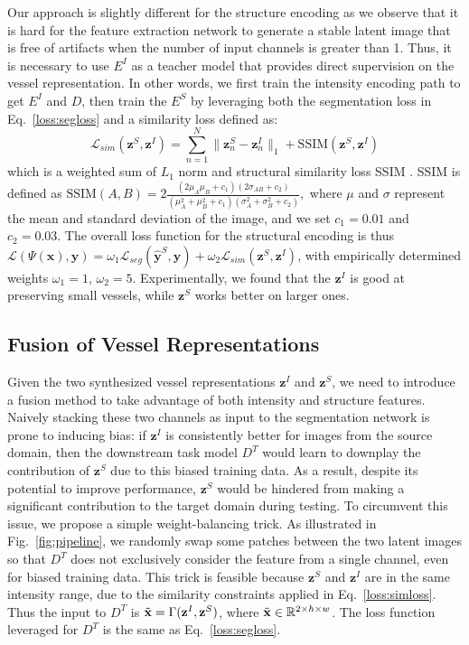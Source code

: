 \documentclass[runningheads]{llncs}
\begin{document}
Our approach is slightly different for the structure encoding as we observe that it is hard for the feature extraction network to generate a stable latent image that is free of artifacts when the number of input channels is greater than 1. Thus, it is necessary to use $E^I$ as a teacher model that provides direct supervision on the vessel representation. In other words, we first train the intensity encoding path to get $E^{I}$ and $D$, then train the $E^{S}$ by leveraging both the segmentation loss in Eq.~\ref{loss:segloss} and a similarity loss defined as: 
\begin{equation}
    \mathcal{L}_{sim}(\mathbf{z}^S,\mathbf{z}^I) =   \sum_{n=1}^N\|\mathbf{z}^S_{n}-\mathbf{z}^I_{n}\|_1 + \mathrm{SSIM}(\mathbf{z}^S, \mathbf{z}^I)
\label{loss:simloss}
\end{equation}
which is a weighted sum of $L_1$ norm and structural similarity loss SSIM \cite{hore2010image}. 
SSIM is defined as 
$
    \mathrm{SSIM}(A, B) = 2\frac{(2\mu_{A}\mu_{B}+c_1)(2\sigma_{AB}+c_2)}{(\mu_{A}^2+\mu_{B}^2+c_1)(\sigma_{A}^2+\sigma_{B}^2+c_2)},
$
where $\mu$ and $\sigma$ represent the mean and standard deviation of the image, and we set $c_1=0.01$ and $c_2=0.03$. The overall loss function for the structural encoding is thus
$\mathcal{L}(\Psi(\mathbf{x}),\mathbf{y}) = \omega_1 \mathcal{L}_{seg}(\hat{\mathbf{y}}^S,\mathbf{y})+\omega_2 \mathcal{L}_{sim}(\mathbf{z}^S,\mathbf{z}^I)$,
with empirically determined weights $\omega_1=1$, $\omega_2=5$. Experimentally, we found that the $\mathbf{z}^I$ is good at preserving small vessels, while $\mathbf{z}^S$ works better on larger ones.


\subsection{Fusion of Vessel Representations} \label{Sec:fusion}
Given the two synthesized vessel representations $\mathbf{z}^I$ and $\mathbf{z}^S$, we need to introduce a fusion method to take advantage of both intensity and structure features. Naively stacking these two channels as input to the segmentation network is prone to inducing bias: if $\mathbf{z}^I$ is consistently better for images from the source domain, then the downstream task model $D^{T}$ would learn to downplay the contribution of $\mathbf{z}^S$ due to this biased training data. As a result, despite its potential to improve performance, $\mathbf{z}^S$ would be hindered from making a significant contribution to the target domain during testing. To circumvent this issue, we propose a simple weight-balancing trick. As illustrated in Fig.~\ref{fig:pipeline}, we randomly swap some patches between the two latent images so that $D^{T}$ does not exclusively consider the feature from a single channel, even for biased training data. This trick is feasible because $\mathbf{z}^S$ and $\mathbf{z}^I$ are in the same intensity range, due to the similarity constraints applied in Eq.~\ref{loss:simloss}. Thus the input to $D^{T}$ is $\Tilde{\mathbf{x}} = \Gamma(\mathbf{z}^I,\mathbf{z}^S)$, where $\Tilde{\mathbf{x}}\in \mathbb{R}^{2\times h\times w}$. The loss function leveraged for $D^{T}$ is the same as Eq.~\ref{loss:segloss}.
\end{document}
